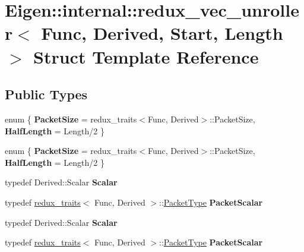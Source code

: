 \hypertarget{struct_eigen_1_1internal_1_1redux__vec__unroller}{}\section{Eigen\+:\+:internal\+:\+:redux\+\_\+vec\+\_\+unroller$<$ Func, Derived, Start, Length $>$ Struct Template Reference}
\label{struct_eigen_1_1internal_1_1redux__vec__unroller}
\subsection*{Public Types}
\begin{DoxyCompactItemize}
\item 
\mbox{\label{struct_eigen_1_1internal_1_1redux__vec__unroller_a72c82ed890a91464a69edfebd12c44e3}} 
enum \{ {\bfseries Packet\+Size} = redux\+\_\+traits$<$Func, Derived$>$\+:\+:Packet\+Size, 
{\bfseries Half\+Length} = Length/2
 \}
\item 
\mbox{\label{struct_eigen_1_1internal_1_1redux__vec__unroller_a15b9a0080400de68ed400333db9dc273}} 
enum \{ {\bfseries Packet\+Size} = redux\+\_\+traits$<$Func, Derived$>$\+:\+:Packet\+Size, 
{\bfseries Half\+Length} = Length/2
 \}
\item 
\mbox{\label{struct_eigen_1_1internal_1_1redux__vec__unroller_a37caf247b75c895c88df3d44bf97bab5}} 
typedef Derived\+::\+Scalar {\bfseries Scalar}
\item 
\mbox{\label{struct_eigen_1_1internal_1_1redux__vec__unroller_a983568f8988c5c8891f9febfbe5e8722}} 
typedef \hyperlink{struct_eigen_1_1internal_1_1redux__traits}{redux\+\_\+traits}$<$ Func, Derived $>$\+::\hyperlink{struct_eigen_1_1_packet_type}{Packet\+Type} {\bfseries Packet\+Scalar}
\item 
\mbox{\label{struct_eigen_1_1internal_1_1redux__vec__unroller_a37caf247b75c895c88df3d44bf97bab5}} 
typedef Derived\+::\+Scalar {\bfseries Scalar}
\item 
\mbox{\label{struct_eigen_1_1internal_1_1redux__vec__unroller_a983568f8988c5c8891f9febfbe5e8722}} 
typedef \hyperlink{struct_eigen_1_1internal_1_1redux__traits}{redux\+\_\+traits}$<$ Func, Derived $>$\+::\hyperlink{struct_eigen_1_1_packet_type}{Packet\+Type} {\bfseries Packet\+Scalar}
\end{DoxyCompactItemize}
